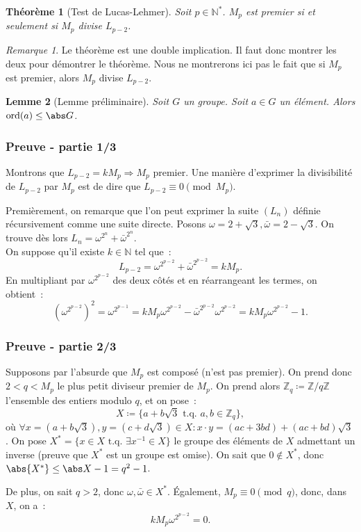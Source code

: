 \documentclass[10pt, mathserif]{beamer}
\DeclareMathOperator{\ord}{ord}
\newcommand{\tq}{\text{ t.q. }}
\newcommand{\Z}{\mathbb Z}
\newcommand{\N}{\mathbb N}
\newtheorem{thm}{Théorème}[section]
\newtheorem{lem}[thm]{Lemme}
\theoremstyle{definition}
\theoremstyle{remark}
\newtheorem*{rmq}{Remarque}
\begin{document}
	\begin{frame}
		\begin{thm}[Test de Lucas-Lehmer]
			Soit $p \in \N^*$. $M_p$ est premier si et seulement si $M_p$ divise $L_{p-2}$.
		\end{thm}

		\begin{rmq}
			Le théorème est une double implication. Il faut donc montrer les deux pour démontrer le théorème. Nous ne montrerons ici pas le fait que si $M_p$
			est premier, alors $M_p$ divise $L_{p-2}$.
		\end{rmq}

		\begin{lem}[Lemme préliminaire]
			Soit $G$ un groupe. Soit $a \in G$ un élément. Alors $\ord(a) \leq \abs G$.
		\end{lem}
	\end{frame}

	\begin{frame}
		\frametitle{Preuve - partie 1/3}

		Montrons que $L_{p-2} = kM_p \Rightarrow M_p$ premier. Une manière d'exprimer la divisibilité de $L_{p-2}$ par $M_p$ est de dire que
		$L_{p-2} \equiv 0 \pmod {M_p}$.

		Premièrement, on remarque que l'on peut exprimer la suite $(L_n)$ définie récursivement comme une suite directe. Posons
		$\omega = 2 + \sqrt 3, \bar \omega = 2 - \sqrt 3$. On trouve dès lors $L_n = \omega^{2^n} + \bar \omega^{2^n}$. \\

		On suppose qu'il existe $k \in \N$ tel que~:
		\[L_{p-2} = \omega^{2^{p-2}} + \bar \omega^{2^{p-2}} = kM_p.\]
		En multipliant par $\omega^{2^{p-2}}$ des deux côtés et en réarrangeant les termes, on obtient~:
		\[\left(\omega^{2^{p-2}}\right)^2 = \omega^{2^{p-1}} = kM_p\omega^{2^{p-2}} - \bar \omega^{2^{p-2}}\omega^{2^{p-2}} = kM_p\omega^{2^{p-2}} - 1.\]
	\end{frame}

	\begin{frame}
		\frametitle{Preuve - partie 2/3}

		Supposons par l'absurde que $M_p$ est composé (n'est pas premier). On prend donc $2 < q < M_p$ le plus petit diviseur premier de $M_p$. On prend
		alors $\Z_q \coloneqq \Z/q\Z$ l'ensemble des entiers modulo $q$, et on pose~:
		\[X \coloneqq \{a + b\sqrt 3 \tq a, b \in \Z_q\},\]
		où $\forall x = (a+b\sqrt 3), y = (c+d\sqrt 3) \in X : x \cdot y = (ac+3bd) + (ac+bd)\sqrt 3$. On pose $X^* = \{x \in X \tq \exists x^{-1} \in X\}$
		le groupe des éléments de $X$ admettant un inverse (preuve que $X^*$ est un groupe est omise). On sait que $0 \not \in X^*$, donc
		$\abs {X^*} \leq \abs X -1=q^2 - 1$.

		De plus, on sait $q > 2$, donc $\omega, \bar \omega \in X^*$. Également, $M_p \equiv 0 \pmod q$, donc, dans $X$, on a~:
		\[kM_p\omega^{2^{p-2}} = 0.\]
	\end{frame}
	
\end{document}
